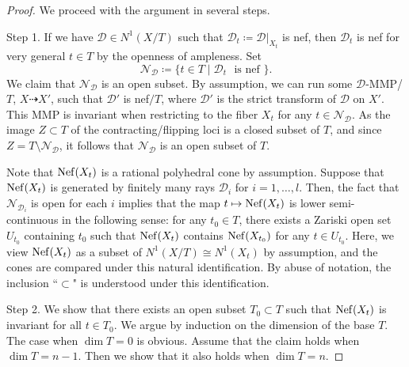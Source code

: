 \documentclass[11pt,oneside,reqno]{amsart}
\numberwithin{equation}{section}
\theoremstyle{definition}
\newcommand{\Nef}{{\rm {Nef}}}
\newcommand{\mD}{\mathcal{D}}
\newcommand{\mN}{\mathcal{N}}
\begin{document}
\begin{proof}
We proceed with the argument in several steps.

Step 1. If we have $\mD \in N^1(X/T)$ such that $\mD_t \coloneqq \mD|_{X_t}$ is nef, then $\mD_t$ is nef for very general $t\in T$ by the openness of ampleness. Set 
\[
\mN_\mD \coloneqq \{t\in T \mid \mD_t \text{~ is nef~}\}.
\] We claim that $\mN_\mD$ is an open subset. By assumption, we can run some $\mD$-MMP/$T$, $X\dasharrow X'$, such that $\mD'$ is nef$/T$, where $\mD'$ is the strict transform of $\mD$ on $X'$. This MMP is invariant when restricting to the fiber $X_t$ for any $t\in \mN_\mD$. As the image $Z \subset T$ of the contracting/flipping loci is a closed subset of $T$, and since $Z = T \setminus \mN_{\mD}$, it follows that $\mN_{\mD}$ is an open subset of $T$.

Note that $\Nef(X_{t})$ is a rational polyhedral cone by assumption. Suppose that $\Nef(X_{t})$ is generated by finitely many rays $\mD_i$ for $i=1, \ldots, l$. Then, the fact that $\mN_{\mD_i}$ is open for each $i$ implies that the map $t\mapsto \Nef(X_t)$ is lower semi-continuous in the following sense: for any $t_0\in T$, there exists a Zariski open set $U_{t_0}$ containing $t_0$ such that $\Nef(X_{t})$ contains $\Nef(X_{t_0})$ for any $t\in U_{t_0}$. Here, we view $\Nef(X_t)$ as a subset of $N^1(X/T)\cong N^1(X_t)$ by assumption, and the cones are compared under this natural identification. By abuse of notation, the inclusion ``$\subset$" is understood under this identification.

Step 2. We show that there exists an open subset $T_0\subset T$ such that $\Nef(X_t)$ is invariant for all $t \in T_0$.  We argue by induction on the dimension of the base $T$. The case when $\dim T=0$ is obvious. Assume that the claim holds when $\dim T =n-1$. Then we show that it also holds when $\dim T=n$.


\end{proof}
\end{document}
